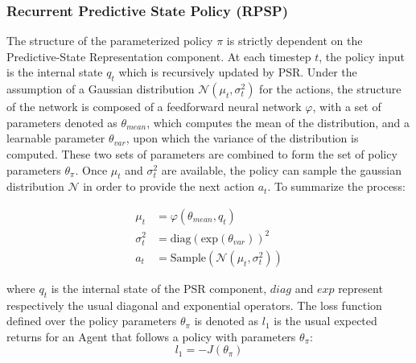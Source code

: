             \subsubsection{Recurrent Predictive State Policy (RPSP)}
                The structure of the parameterized policy $\pi$ is strictly dependent on the Predictive-State Representation component. At each timestep $t$, the policy input is the internal state $q_t$ which is recursively updated by PSR. Under the assumption of a Gaussian distribution $\mathcal{N}(\mu_{t}, \sigma_{t}^{2})$ for the actions, the structure of the network is composed of a feedforward neural network $\varphi$, with a set of parameters denoted as $\theta_{mean}$, which computes the mean of the distribution, and a learnable parameter $\theta_{var}$, upon which the variance of the distribution is computed. These two sets of parameters are combined to form the set of policy parameters $\theta_\pi$. Once $\mu_{t}$ and $\sigma_{t}^{2}$ are available, the policy can sample the gaussian distribution $\mathcal{N}$ in order to provide the next action $a_t$. To summarize the process:
                
                \begin{align*}
                    \mu_{t} &= \varphi(\theta_{mean}, q_t)\\ \sigma_{t}^{2} &= \text{diag}(\text{exp}(\theta_{var}))^{2}\\
                    a_t &= \text{Sample}(\mathcal{N}(\mu_{t}, \sigma_{t}^{2}))
                \end{align*}
                
                where $q_t$ is the internal state of the PSR component, $diag$ and $exp$ represent respectively the usual diagonal and exponential operators. \newline
                The loss function defined over the policy parameters $\theta_\pi$ is denoted as $l_1$ is the usual expected returns for an Agent that follows a policy with parameters $\theta_\pi$:
                \[ l_1 = -J(\theta_\pi)\]
            

